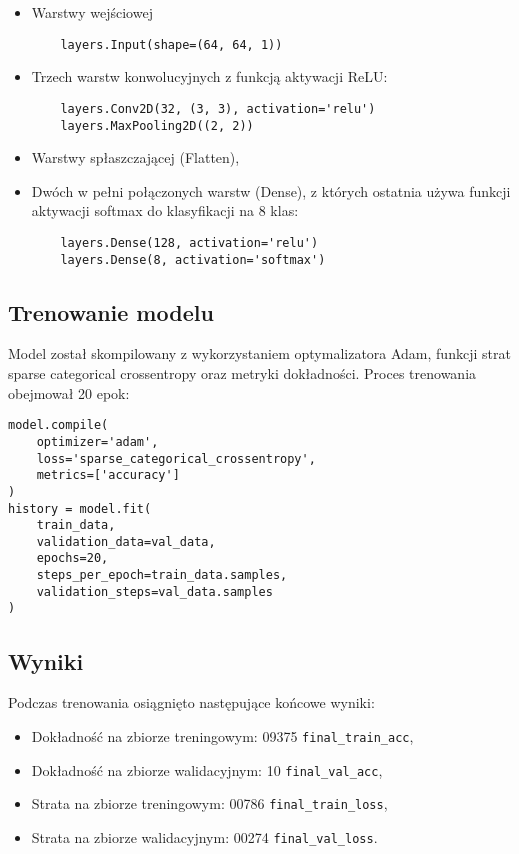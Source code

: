 \begin{itemize}
    \item Warstwy wejściowej
    \begin {verbatim}
    layers.Input(shape=(64, 64, 1))
    \end {verbatim}
    \item Trzech warstw konwolucyjnych z funkcją aktywacji ReLU:
    \begin{verbatim}
    layers.Conv2D(32, (3, 3), activation='relu')
    layers.MaxPooling2D((2, 2))
    \end{verbatim}
    \item Warstwy spłaszczającej (Flatten),
    \item Dwóch w pełni połączonych warstw (Dense), z których ostatnia używa funkcji aktywacji softmax do klasyfikacji na 8 klas:
    \begin{verbatim}
    layers.Dense(128, activation='relu')
    layers.Dense(8, activation='softmax')
    \end{verbatim}
\end{itemize}

\subsection{Trenowanie modelu}\label{subsec:trenowanie-modelu}

Model został skompilowany z wykorzystaniem optymalizatora Adam, funkcji strat sparse categorical crossentropy oraz metryki dokładności.
Proces trenowania obejmował 20 epok:

\begin{verbatim}
model.compile(
    optimizer='adam',
    loss='sparse_categorical_crossentropy',
    metrics=['accuracy']
)
history = model.fit(
    train_data,
    validation_data=val_data,
    epochs=20,
    steps_per_epoch=train_data.samples,
    validation_steps=val_data.samples
)
\end{verbatim}

\subsection{Wyniki}\label{subsec:wyniki}

Podczas trenowania osiągnięto następujące końcowe wyniki:

\begin{itemize}
    \item Dokładność na zbiorze treningowym: 09375 \texttt{final\_train\_acc},
    \item Dokładność na zbiorze walidacyjnym: 10  \texttt{final\_val\_acc},
    \item Strata na zbiorze treningowym: 00786  \texttt{final\_train\_loss},
    \item Strata na zbiorze walidacyjnym: 00274  \texttt{final\_val\_loss}.
\end{itemize}

